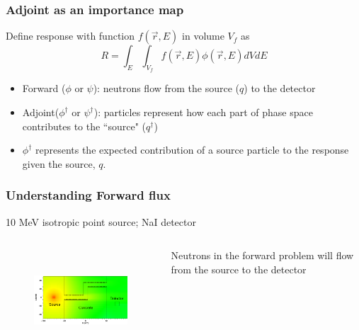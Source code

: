 \documentclass[xcolor=x11names,compress]{beamer}
\renewcommand{\(}{\begin{columns}}
\renewcommand{\)}{\end{columns}}
\newcommand{\<}[1]{\begin{column}{#1}}
\renewcommand{\>}{\end{column}}
\newcommand{\ve}[1]{\ensuremath{\vec{#1}}}
\begin{document}
\begin{frame}[fragile]
  \frametitle{Adjoint as an importance map}
Define response with function $f(\ve{r}, E)$ in volume $V_f$ as
%
\begin{equation}
 R = \int_E \int_{V_f} f(\ve{r}, E) \phi(\ve{r}, E) dV dE 
 \label{eq:Response}
\end{equation}
\pause
\begin{itemize}
\item Forward ($\phi$ or $\psi$): neutrons flow from the source ($q$) to the detector
\item Adjoint($\phi^{\dagger}$ or $\psi^{\dagger}$): particles represent how each part of phase space contributes to the ``source" ($q^{\dagger}$)
\item $\phi^{\dagger}$ represents the expected contribution of a source particle to the response given the source, $q$.
\end{itemize}


\end{frame}
\begin{frame}[fragile]

  \frametitle{Understanding Forward flux}
  10 MeV isotropic point source; NaI detector
  \begin{columns}
   \begin{column}{0.75\textwidth}
   \begin{figure}
   \includegraphics[height=1.5in,clip]{../figs/maze-forward.png}
   \end{figure}
   \end{column}
  \begin{column}{0.25\textwidth}
Neutrons in the forward problem will flow from the source to the detector
   \end{column}
\end{columns}
	
\end{frame}
\end{document}
